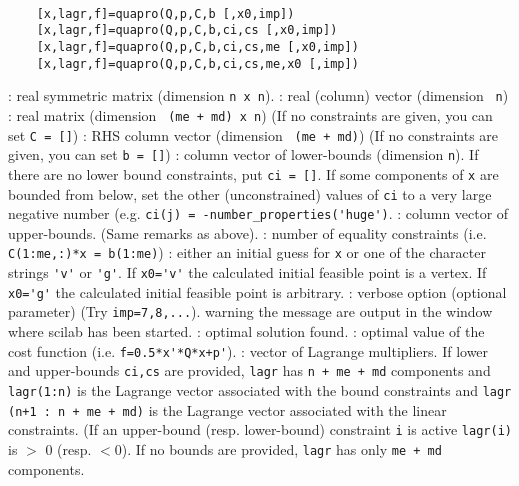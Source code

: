 
\begin{mandesc}
   \\
\end{mandesc}
\label{quapro}
\begin{calling_sequence}
  \begin{verbatim}
    [x,lagr,f]=quapro(Q,p,C,b [,x0,imp])  
    [x,lagr,f]=quapro(Q,p,C,b,ci,cs [,x0,imp])  
    [x,lagr,f]=quapro(Q,p,C,b,ci,cs,me [,x0,imp])  
    [x,lagr,f]=quapro(Q,p,C,b,ci,cs,me,x0 [,imp])  
  \end{verbatim}
\end{calling_sequence}
\begin{parameters}
  \begin{varlist}
     : real symmetric matrix (dimension \verb!n x n!).
     : real (column) vector (dimension \verb! n!)
     : real matrix (dimension \verb! (me + md) x n!) (If no constraints are given, you can set \verb!C = []!)
    : RHS column vector (dimension \verb! (me + md)!) (If no constraints are given, you can set \verb!b = []!)
    : column vector of lower-bounds (dimension \verb!n!). If there are no lower bound constraints, put \verb!ci = []!. If some components of \verb!x! are bounded from below, set the other (unconstrained) values of \verb!ci! to a very  large negative  number (e.g. \verb!ci(j) = -number_properties('huge')!.
    : column vector of upper-bounds. (Same remarks as above).
    : number of equality constraints (i.e. \verb!C(1:me,:)*x = b(1:me)!)
    : either an initial guess for \verb!x!    or one of the character strings \verb!'v'! or \verb!'g'!. If \verb!x0='v'! the calculated initial feasible point is a vertex. If \verb!x0='g'! the calculated initial feasible point is arbitrary.
    : verbose option (optional parameter)   (Try \verb!imp=7,8,...!). warning the message are output in the window where scilab has been started.
    : optimal solution found.
    : optimal value of the cost function (i.e. \verb!f=0.5*x'*Q*x+p'!).
    : vector of Lagrange multipliers.  If lower and upper-bounds \verb!ci,cs! are provided, \verb!lagr! has  \verb!n + me + md! components and \verb!lagr(1:n)! is the Lagrange  vector associated with the bound constraints and  \verb!lagr (n+1 : n + me + md)! is the Lagrange vector associated  with the linear constraints. (If an upper-bound (resp. lower-bound) constraint \verb!i! is active  \verb!lagr(i)! is $>$ 0 (resp. $<$0). If no bounds are provided, \verb!lagr! has only \verb!me + md! components.
  \end{varlist}

\end{parameters}

